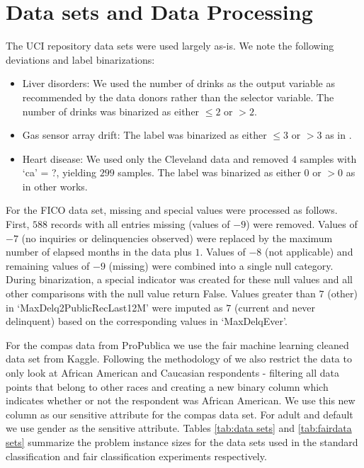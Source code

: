 \documentclass[twoside,11pt]{article}
\begin{document}
\section{Data sets and Data Processing} \label{app:data sets}
The UCI repository data sets were used largely as-is.  We note the following deviations and label binarizations:
\begin{itemize}
\item Liver disorders: We used the number of drinks as the output variable as recommended by the data donors rather than the selector variable. The number of drinks was binarized as either $\leq 2$ or $> 2$. 
\item Gas sensor array drift:  The label was binarized as either $\leq 3$ or $> 3$ as in \citep{dash2014}. 
\item Heart disease:  We used only the Cleveland data and removed $4$ samples with `ca' = ?, yielding $299$ samples. The label was binarized as either $0$ or $> 0$ as in other works.
\end{itemize}

For the FICO data set, missing and special values were processed as follows. First, $588$ records with all entries missing (values of $-9$) were removed.  Values of $-7$ (no inquiries or delinquencies observed) were replaced by the maximum number of elapsed months in the data plus $1$.  Values of $-8$ (not applicable) and remaining values of $-9$ (missing) were combined into a single null category.  During binarization, a special indicator was created for these null values and all other comparisons with the null value return False.  Values greater than $7$ (other) in `MaxDelq2PublicRecLast12M' were imputed as $7$ (current and never delinquent) based on the corresponding values in `MaxDelqEver'.

For the compas data from ProPublica \citep{propub} we use the fair machine learning cleaned data set from Kaggle. Following the methodology of \citep{zafar2015fairness} we also restrict the data to only look at African American and Caucasian respondents - filtering all data points that belong to other races and creating a new binary column  which indicates whether or not the respondent was African American. We use this new column as our sensitive attribute for the compas data set. For adult and default we use gender as the sensitive attribute. Tables \ref{tab:data sets} and \ref{tab:fairdata sets} summarize the problem instance sizes for the data sets used in the standard classification and fair classification experiments respectively.
\end{document}
